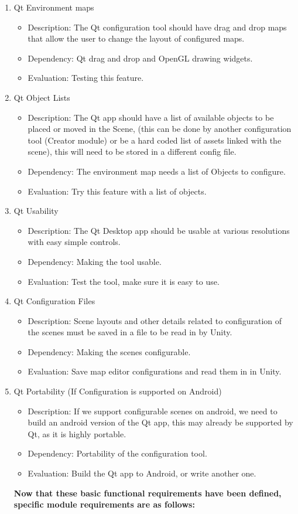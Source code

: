 \documentclass[a4paper,10pt]{article}
\begin{document}
\begin{enumerate}
\begin{itemize}
		\end{itemize}
		\item Qt Environment maps
		\begin{itemize}
		\item Description: The Qt configuration tool should have drag and drop maps that allow the user to change the layout of configured maps.
		\item Dependency:  Qt drag and drop and OpenGL drawing widgets. 
		\item Evaluation:  Testing this feature.
		\end{itemize}
		\item Qt Object Lists
		\begin{itemize}
		\item Description: The Qt app should have a list of available objects to be placed or moved in the Scene, (this can be done by another configuration tool 
		(Creator module) or be a hard coded list of assets linked with the scene), this will need to be stored in a different config file. 
		\item Dependency:  The environment map needs a list of Objects to configure. 
		\item Evaluation:  Try this feature with a list of objects.
		\end{itemize}

		\item Qt Usability
		\begin{itemize}
		\item Description: The Qt Desktop app should be usable at various resolutions with easy simple controls. 
		\item Dependency:  Making the tool usable.
		\item Evaluation:  Test the tool, make sure it is easy to use.
		\end{itemize}
		
		\item Qt Configuration Files
		\begin{itemize}
		\item Description: Scene layouts and other details related to configuration of the scenes must be saved in a file to be read in by Unity.
		\item Dependency:  Making the scenes configurable.
		\item Evaluation:  Save map editor configurations and read them in in Unity.
		\end{itemize}
		\item Qt Portability (If Configuration is supported on Android)
		\begin{itemize}
		\item Description: If we support configurable scenes on android, we need to build an android version of the Qt app, this may already be supported by Qt, as it is highly portable.
		\item Dependency:  Portability of the configuration tool.
		\item Evaluation:  Build the Qt app to Android, or write another one. 
		\end{itemize}
		\textbf{Now that these basic functional requirements have been defined, specific module requirements are as follows:}
		

\end{enumerate}
\end{document}
